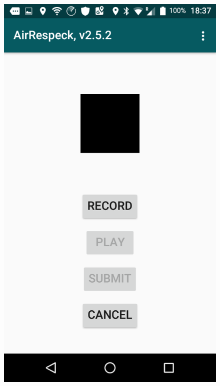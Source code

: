 \begin{figure}[H]
\begin{minipage}[b]{0.33\linewidth}
    \includegraphics[width=.8\linewidth]{images/audio} 
    \vspace{3ex}
  \end{minipage}%
  \begin{minipage}[b]{0.33\linewidth}
    \centering

\end{minipage}
\end{figure}
